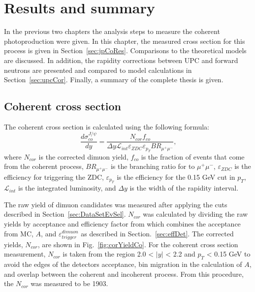 \chapter{Results and summary}
  In the previous two chapters the analysis steps to measure the coherent
    \JPsi{} photoproduction were given.
  In this chapter, the measured cross section for this process is given
    in Section~\ref{sec:jpCoRes}.
  Comparisons to the theoretical models are discussed. 
  In addition, the rapidity corrections between UPC \JPsi{} and forward
    neutrons are presented and compared to model calculations in 
    Section~\ref{sec:upcCor}. 
  Finally, a summary of the complete thesis is given.  
  
  \section{Coherent \JPsi{} cross section}
  The coherent \JPsi{} cross section is calculated using the following formula:
  \begin{equation}
    \frac{d\sigma^{J/\psi}_{co}}{dy}  = \frac{N_{cor} f_{co}  }
    { \Delta y\mathcal{L}_{int} \varepsilon_{ZDC} \varepsilon_{p_{T}} 
    BR_{\mu^{+}\mu^{-}}}\textrm{,}
    \label{eq:expXSecCo}
   \end{equation}
   where $N_{cor}$ is the corrected dimuon yield, $f_{co}$ is the 
     fraction of events that come from the coherent process, 
     $BR_{\mu^{+}\mu^{-}}$ is the branching ratio for \JPsi{} to $\mu^{+}\mu^{-}$, 
     $\varepsilon_{ZDC}$ is the efficiency for triggering the ZDC, 
     $\varepsilon_{p_{T}}$ is the efficiency for the 0.15 GeV cut in $p_{T}$, 
     $\mathcal{L}_{int}$ is the integrated luminosity, and $\Delta y$ is the 
     width of the rapidity interval.

  The raw yield of dimuon candidates was measured after applying the cuts 
    described in Section~\ref{sec:DataSetEvSel}.
  $N_{cor}$ was calculated by dividing the raw yields by acceptance and 
    efficiency factor from which combines the acceptance from MC, $A$, and 
    $\varepsilon^{dimuon}_{trigger}$ as described in Section.~\ref{sec:effDet}.
  The corrected yields, $N_{cor}$, are shown in Fig.~\ref{fig:corYieldCo}.
  For the coherent cross section measurement, $N_{cor}$ is taken from the 
    region 2.0 < $|y|$ < 2.2 and $p_{T}$ < 0.15 GeV to avoid the edges of the
    detectors acceptance, bin migration in the calculation of $A$, and overlap
    between the coherent and incoherent process.
  From this procedure, the $N_{cor}$ was measured to be 1903.
  
